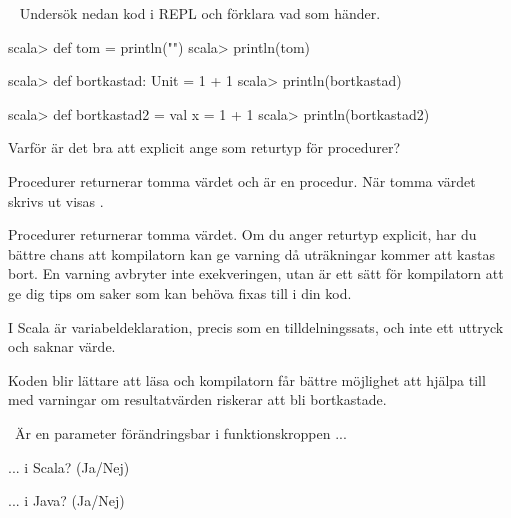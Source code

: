 \Task  \what~ Undersök nedan kod i REPL och förklara vad som händer.

\Subtask
\begin{REPL}
scala> def tom = println("")
scala> println(tom)
\end{REPL}

\Subtask
\begin{REPL}
scala> def bortkastad: Unit = 1 + 1
scala> println(bortkastad)
\end{REPL}

\Subtask
\begin{REPL}
scala> def bortkastad2 = { val x = 1 + 1 }
scala> println(bortkastad2)
\end{REPL}

\Subtask Varför är det bra att explicit ange  som returtyp för procedurer?

\SOLUTION

\TaskSolved \what

\SubtaskSolved Procedurer returnerar tomma värdet och  är en procedur. När tomma värdet skrivs ut visas \code{()}.

\SubtaskSolved Procedurer returnerar tomma värdet. Om du anger returtyp  explicit, har du bättre chans att kompilatorn kan ge varning då uträkningar kommer att kastas bort. En varning avbryter inte exekveringen, utan är ett sätt för kompilatorn att ge dig tips om saker som kan behöva fixas till i din kod.

\SubtaskSolved I Scala är variabeldeklaration, precis som en tilldelningssats, och inte ett uttryck och saknar värde.

\SubtaskSolved  Koden blir lättare att läsa och kompilatorn får bättre möjlighet att hjälpa till med varningar om resultatvärden riskerar att bli bortkastade.

\QUESTEND


\clearpage

\AdvancedTasks %





\QUESTBEGIN

\Task \what~Är en parameter förändringsbar i funktionskroppen ...

\Subtask ... i Scala?  (Ja/Nej)

\Subtask ... i Java?  (Ja/Nej)

\SOLUTION

\TaskSolved \what~

